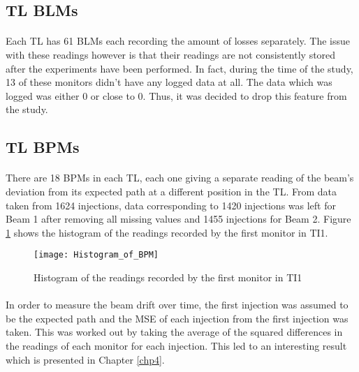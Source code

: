 \subsection{\acs{TL} \acs{BLM}s}
\label{subsec::TLBLM}
\paragraph{ }Each \acs{TL} has 61 \acs{BLM}s each recording the amount of losses separately. The issue with these readings however is that their readings are not consistently stored after the experiments have been performed. In fact, during the time of the study, 13 of these monitors didn't have any logged data at all. The data which was logged was either 0 or close to 0. Thus, it was decided to drop this feature from the study.   

\subsection{\acs{TL} \acs{BPM}s}
\paragraph{ }There are 18 \acs{BPM}s in each \acs{TL}, each one giving a separate reading of the beam's deviation from its expected path at a different position in the \acs{TL}. From data taken from 1624 injections, data corresponding to 1420 injections was left for Beam 1 after removing all missing values and 1455 injections for Beam 2. Figure \ref{fig::BPM_hist} shows the histogram of the readings recorded by the first monitor in TI1.

\begin{figure}[b]
	\centering
	\texttt{[image: Histogram\_of\_BPM]}
	\caption[BPM Histogram]{Histogram of the readings recorded by the first monitor in TI1}
	\label{fig::BPM_hist}
\end{figure} 

\paragraph{ }In order to measure the beam drift over time, the first injection was assumed to be the expected path and the \acs{MSE} of each injection from the first injection was taken. This was worked out by taking the average of the squared differences in the readings of each monitor for each injection. This led to an interesting result which is presented in Chapter \ref{chp4}.

